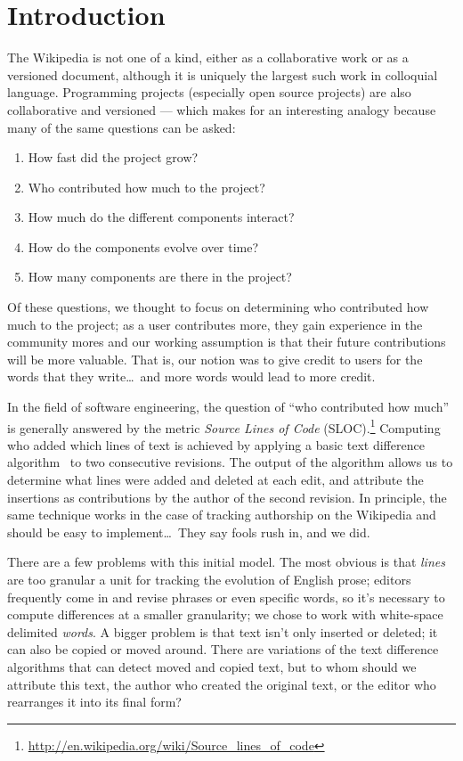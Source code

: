 
\section{Introduction}
\label{sec:diff-intro}

The Wikipedia is not one of a kind, either as a collaborative work or as
a versioned document, although it is uniquely the largest such work
in colloquial language.
Programming projects (especially open source projects)
are also collaborative and versioned --- which makes for
an interesting analogy because many of the same questions can be asked:
\begin{enumerate}
\item How fast did the project grow?
\item Who contributed how much to the project?
\item How much do the different components interact?
\item How do the components evolve over time?
\item How many components are there in the project?
\end{enumerate}
Of these questions, we thought to focus on determining who contributed
how much to the project; as a user contributes more, they gain experience
in the community mores and our working assumption is that their future
contributions will be more valuable.
That is, our notion was to give credit to users for the words that
they write\ldots\ and more words would lead to more credit.

In the field of software engineering, the question of ``who contributed
how much'' is generally answered by the metric
\textit{Source Lines of Code} (SLOC).\footnote{\url{http://en.wikipedia.org/wiki/Source_lines_of_code}}
Computing who added which lines of text is achieved
by applying a basic text difference
algorithm~\cite{Myers86,TichyEditDist,Burns1997} to two consecutive
revisions.
The output of the algorithm allows us to determine what lines were added and
deleted at each edit, and attribute the insertions as contributions by the
author of the second revision.
In principle, the same technique works in the case of tracking authorship
on the Wikipedia and should be easy to implement\ldots\ They say fools rush in, and we did.

There are a few problems with this initial model.
The most obvious is that \textit{lines} are too granular
a unit for tracking the evolution of English prose;
editors frequently come in and revise phrases or
even specific words, so it's necessary to compute
differences at a smaller granularity;
we chose to work with white-space delimited \textit{words}.
A bigger problem is that text isn't only inserted
or deleted; it can also be copied or moved around.
There are variations of the text difference algorithms that can
detect moved and copied text, but to whom should we attribute this text,
the author who created the original text, or the editor who rearranges it
into its final form?

